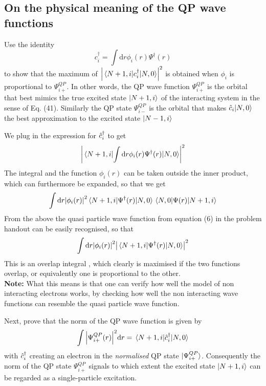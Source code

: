 \subsection{On the physical meaning of the QP wave functions}
\begin{exercise}
Use the identity 
\begin{equation}
c_i^{\dagger} = \int \mathrm{d}r\phi_i(r)\Psi^{\dagger}(r)
\end{equation}
to show that the maximum of $\abs{\mel{N+1,i}{c_i^{\dagger}}{N,0}}^2$ is obtained when $\phi_i$ is proportional to $\Psi^{QP}_{i+}$. In other words, the QP wave function $\Psi_{i+}^{QP}$ is the orbital that best mimics the true excited state $|N+1,i\rangle$ of the interacting system in the sense of Eq. (41). Similarly the QP state $\Psi_{i-}^{QP}$ is the orbital that makes $\hat{c}_{i} |N,0\rangle$ the best approximation to the excited state $|N-1,i\rangle$
\end{exercise}


\begin{solution}
We plug in the expression for $\hat{c}_{i}^{\dagger}$ to get
\begin{equation}
    \abs{\mel{N+1,i}{\int \mathrm{d}r\phi_i(r)\Psi^{\dagger}(r)}{N,0}}^2
\end{equation}
The integral and the function $\phi_i(r)$ can be taken outside the inner product, which can furthermore be expanded, so that we get
\begin{equation}
    \int \mathrm{d}r \abs{\phi_i(r)}^2 \mel{N+1,i}{\Psi^{\dagger}(r)}{N,0}\mel{N,0}{\Psi(r)}{N+1,i}
\end{equation}
From the above the quasi particle wave function from equation (6) in the problem handout can be easily recognised, so that
\begin{equation}
    \int \mathrm{d}r \abs{\phi_i(r)}^2 \abs{\mel{N+1,i}{\Psi^{\dagger}(r)}{N,0}}^2
\end{equation}
This is an overlap integral , which clearly is maximised if the two functions overlap, or equivalently one is proportional to the other. \\
\textbf{Note:} What this means is that one can verify how well the model of non interacting electrons works, by checking how well the non interacting wave functions can resemble the quasi particle wave function.
\end{solution}

\begin{exercise}
Next, prove that the norm of the QP wave function is given by
\begin{equation}
    \int \abs{\Psi_{i+}^{QP}(r)}^2 \mathrm{d}r = \mel{N+1,i}{\hat{c}_{i}^{\dagger}}{N,0}
\end{equation}
with $\hat{c}_{i}^{\dagger}$ creating an electron in the \textit{normalised} QP state $|\Psi_{i+}^{QP}\rangle$. Consequently the norm of the QP state $\Psi_{i+}^{QP}$ signals to which extent the excited state $|N+1,i\rangle$ can be regarded as a single-particle excitation.
\end{exercise}


